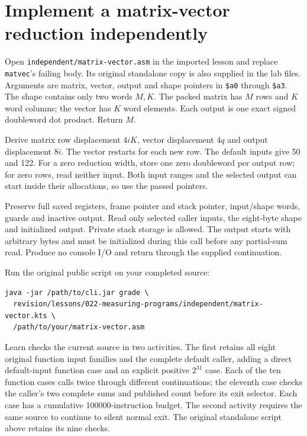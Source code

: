 \section{Implement a matrix-vector reduction independently}

Open \texttt{independent/matrix-vector.asm} in the imported lesson and replace
\texttt{matvec}'s failing body. Its original standalone copy is also supplied in
the lab files.
Arguments are matrix, vector, output and shape pointers in \texttt{\$a0} through
\texttt{\$a3}. The shape contains only two words $M,K$. The packed matrix has
$M$ rows and $K$ word columns; the vector has $K$ word elements. Each output is
one exact signed doubleword dot product. Return $M$.

Derive matrix row displacement $4iK$, vector displacement $4q$ and output
displacement $8i$. The vector restarts for each new row. The default inputs give
50 and 122. For a zero reduction width, store one zero doubleword per output row;
for zero rows, read neither input. Both input ranges and the selected output can
start inside their allocations, so use the passed pointers.

Preserve full saved registers, frame pointer and stack pointer, input/shape words,
guards and inactive output. Read only selected caller inputs, the eight-byte shape
and initialized output. Private stack storage is allowed. The output starts with
arbitrary bytes and must be initialized during this call before any partial-sum
read. Produce no console I/O and return through the supplied continuation.

\noindent\begin{minipage}{\linewidth}
  Run the original public script on your completed source:
  \begin{verbatim}
java -jar /path/to/cli.jar grade \
  revision/lessons/022-measuring-programs/independent/matrix-vector.kts \
  /path/to/your/matrix-vector.asm
\end{verbatim}
\end{minipage}
\par\medskip

Learn checks the current source in two activities. The first retains all eight
original function input families and the complete default caller, adding a direct
default-input function case and an explicit positive $2^{31}$ case. Each of the
ten function cases calls twice through different continuations; the eleventh
case checks the caller's two complete sums and published count before its exit
selector. Each case has a cumulative 100000-instruction budget. The second
activity requires the same source to continue to silent normal exit. The original
standalone script above retains its nine checks.

